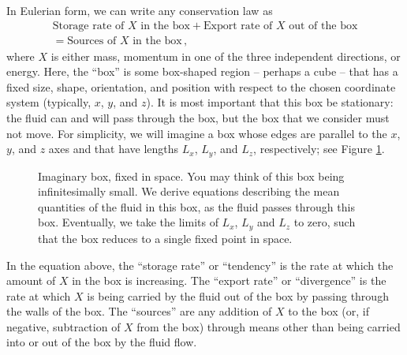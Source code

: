 \documentclass[12pt]{article}
\begin{document}
In Eulerian form, we can write any conservation law as
\begin{multline}
\text{Storage rate of $X$ in the box} + \text{Export rate of $X$ out of the box} \\ = \text{Sources of $X$ in the box} \, , \label{conservation}
\end{multline}
where $X$ is either mass, momentum in one of the three independent directions, or energy.  Here, the ``box'' is some box-shaped region -- perhaps a cube -- that has a fixed size, shape, orientation, and position with respect to the chosen coordinate system (typically, $x$, $y$, and $z$).  It is most important that this box be stationary: the fluid can and will pass through the box, but the box that we consider must not move.  For simplicity, we will imagine a box whose edges are parallel to the $x$, $y$, and $z$ axes and that have lengths $L_x$, $L_y$, and $L_z$, respectively; see Figure \ref{imaginary_box}.


\begin{figure}
\begin{center}
\caption{Imaginary box, fixed in space. You may think of this box being infinitesimally small.  We derive equations describing the mean quantities of the fluid in this box, as the fluid passes through this box. Eventually, we take the limits of $L_x$, $L_y$ and $L_z$ to zero, such that the box reduces to a single fixed point in space.}
\label{imaginary_box}
\end{center}
\end{figure}


In the equation above, the ``storage rate'' or ``tendency'' is the rate at which the amount of $X$ in the box is increasing.  The ``export rate'' or ``divergence'' is the rate at which $X$ is being carried by the fluid out of the box by passing through the walls of the box.  The ``sources'' are any addition of $X$ to the box (or, if negative, subtraction of $X$ from the box) through means other than being carried into or out of the box by the fluid flow.
\end{document}
